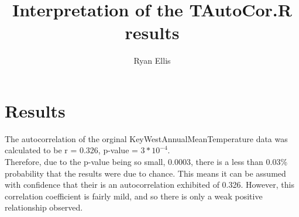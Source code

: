 \documentclass[a4paper, 11pt]{article} %
\title{Interpretation of the TAutoCor.R results}
\author{Ryan Ellis}
\date{}
\begin{document}
\maketitle

\section{Results}
The autocorrelation of the orginal KeyWestAnnualMeanTemperature data was calculated to be r = 0.326, p-value = $3*10^{-4}$.
\\ Therefore, due to the p-value being so small, 0.0003, there is a less than 0.03\% probability that the results were due to chance. This means it can be assumed with confidence that their is an autocorrelation exhibited of 0.326. However, this correlation coefficient is fairly mild, and so there is only a weak positive relationship observed. 
\end{document}
